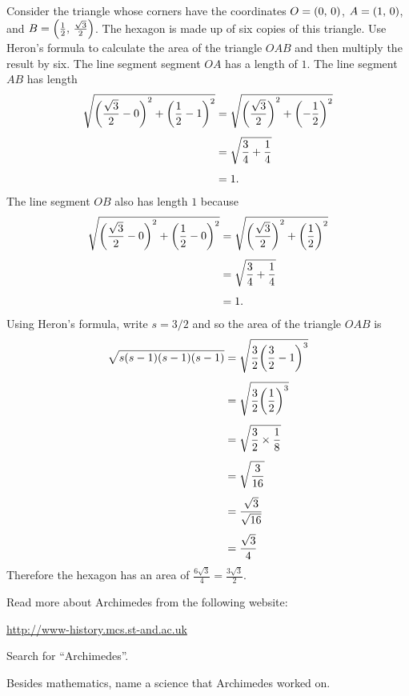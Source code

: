 \documentclass[a4paper,oneside,12pt]{article}
\begin{document}
\begin{problem}
{\begin{solution}
  Consider the triangle whose corners have the coordinates
  $O = \tuple{0}{0}$, $A = \tuple{1}{0}$, and
  $B = \tuple{\frac{1}{2}}{\frac{\sqrt{3}}{2}}$.  The hexagon is made
  up of six copies of this triangle.  Use Heron's formula to calculate
  the area of the triangle $OAB$ and then multiply the result by six.
  The line segment segment $OA$ has a length of $1$.  The line segment
  $AB$ has length
  \begin{align*}
  \sqrt{
    \parenthesis*{\frac{\sqrt{3}}{2} - 0}^2
    +
    \parenthesis*{\frac{1}{2} - 1}^2
  }
  &=
  \sqrt{
    \parenthesis*{\frac{\sqrt{3}}{2}}^2
    +
    \parenthesis*{-\frac{1}{2}}^2
  } \\[4pt]
  &=
  \sqrt{
    \frac{3}{4} + \frac{1}{4}
  } \\[4pt]
  &=
  1.
  \end{align*}
  The line segment $OB$ also has length $1$ because
  \begin{align*}
  \sqrt{
    \parenthesis*{\frac{\sqrt{3}}{2} - 0}^2
    +
    \parenthesis*{\frac{1}{2} - 0}^2
  }
  &=
  \sqrt{
    \parenthesis*{\frac{\sqrt{3}}{2}}^2
    +
    \parenthesis*{\frac{1}{2}}^2
  } \\[4pt]
  &=
  \sqrt{
    \frac{3}{4}
    +
    \frac{1}{4}
  } \\[4pt]
  &=
  1.
  \end{align*}
  Using Heron's formula, write $s = 3 / 2$ and so the area of the
  triangle $OAB$ is
  \begin{align*}
  \sqrt{
    s (s - 1) (s - 1) (s - 1)
  }
  &=
  \sqrt{
    \frac{3}{2} \parenthesis*{\frac{3}{2} - 1}^3
  } \\[4pt]
  &=
  \sqrt{
    \frac{3}{2} \parenthesis*{\frac{1}{2}}^3
  } \\[4pt]
  &=
  \sqrt{
    \frac{3}{2} \times \frac{1}{8}
  } \\[4pt]
  &=
  \sqrt{\frac{3}{16}} \\[4pt]
  &=
  \frac{\sqrt{3}}{\sqrt{16}} \\[4pt]
  &=
  \frac{\sqrt{3}}{4}
  \end{align*}
  Therefore the hexagon has an area of
  $\frac{6\sqrt{3}}{4} = \frac{3\sqrt{3}}{2}$.
  \end{solution}
}{}

\item Read more about Archimedes from the following website:
  \begin{center}
  \url{http://www-history.mcs.st-and.ac.uk}
  \end{center}
  Search for ``Archimedes''.
  \begin{packedenum}
  \item Besides mathematics, name a science that Archimedes worked
    on.


\end{packedenum}
\end{problem}
\end{document}
